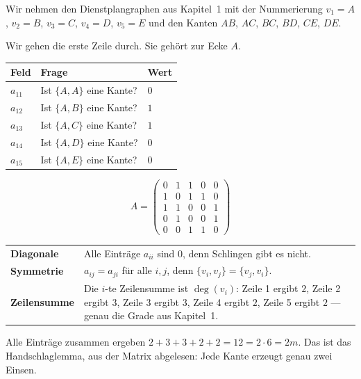 \begin{merksatz}
Wir nehmen den Dienstplangraphen aus Kapitel~1 mit der Nummerierung $v_1 = A$, $v_2 = B$, $v_3 = C$, $v_4 = D$, $v_5 = E$ und den Kanten $AB$, $AC$, $BC$, $BD$, $CE$, $DE$.

Wir gehen die erste Zeile durch. Sie gehört zur Ecke $A$.
\begin{center}
{\small
\renewcommand{\arraystretch}{1.4}
\begin{tabular}{@{}P{1.4cm}P{3.6cm}P{1.4cm}@{}}
\toprule
\textbf{Feld} & \textbf{Frage} & \textbf{Wert}\\
\midrule
$a_{11}$ & Ist $\{A,A\}$ eine Kante? & $0$\\
$a_{12}$ & Ist $\{A,B\}$ eine Kante? & $1$\\
$a_{13}$ & Ist $\{A,C\}$ eine Kante? & $1$\\
$a_{14}$ & Ist $\{A,D\}$ eine Kante? & $0$\\
$a_{15}$ & Ist $\{A,E\}$ eine Kante? & $0$\\
\bottomrule
\end{tabular}}
\end{center}

\[ A = \begin{pmatrix}
0 & 1 & 1 & 0 & 0 \\
1 & 0 & 1 & 1 & 0 \\
1 & 1 & 0 & 0 & 1 \\
0 & 1 & 0 & 0 & 1 \\
0 & 0 & 1 & 1 & 0
\end{pmatrix} \]

\begin{center}
\renewcommand{\arraystretch}{1.45}
\begin{tabular}{@{}P{2.8cm}P{5.6cm}@{}}
\toprule
\textbf{Diagonale} & Alle Einträge $a_{ii}$ sind $0$, denn Schlingen gibt es nicht.\\
\textbf{Symmetrie} & $a_{ij} = a_{ji}$ für alle $i,j$, denn $\{v_i,v_j\} = \{v_j,v_i\}$.\\
\textbf{Zeilensumme} & Die $i$-te Zeilensumme ist $\deg(v_i)$: Zeile 1 ergibt $2$, Zeile 2 ergibt $3$, Zeile 3 ergibt $3$, Zeile 4 ergibt $2$, Zeile 5 ergibt $2$ --- genau die Grade aus Kapitel~1.\\
\bottomrule
\end{tabular}
\end{center}

Alle Einträge zusammen ergeben $2+3+3+2+2 = 12 = 2 \cdot 6 = 2m$. Das ist das Handschlaglemma, aus der Matrix abgelesen: Jede Kante erzeugt genau zwei Einsen.
\end{merksatz}

